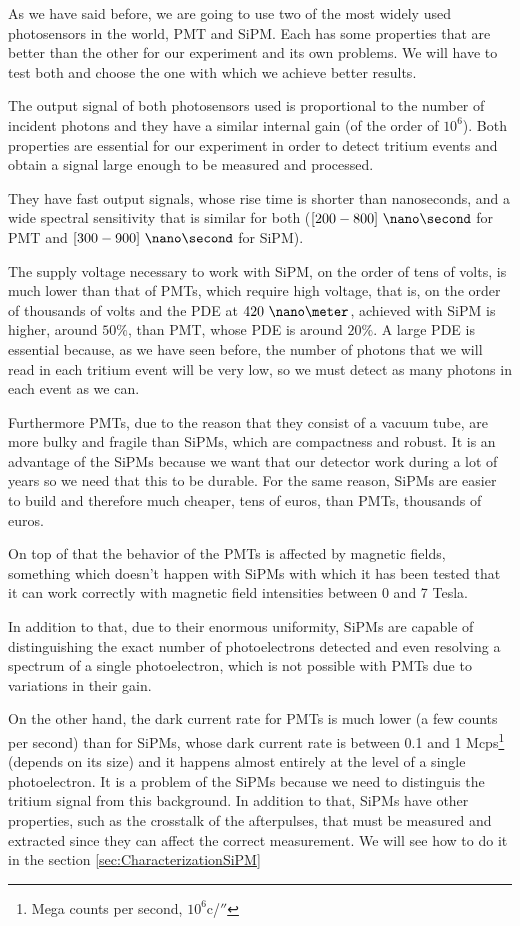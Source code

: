 As we have said before, we are going to use two of the most widely used photosensors in the world, PMT and SiPM. Each has some properties that are better than the other for our experiment and its own problems. We will have to test both and choose the one with which we achieve better results.

The output signal of both photosensors used is proportional to the number of incident photons and they have a similar internal gain (of the order of $10^6$). Both properties are essential for our experiment in order to detect tritium events and obtain a signal large enough to be measured and processed. 

They have fast output signals, whose rise time is shorter than nanoseconds, and a wide spectral sensitivity that is similar for both ($[200-800]~\nano\second$ for PMT and $[300-900]~\nano\second$ for SiPM).

The supply voltage necessary to work with SiPM, on the order of tens of volts, is much lower than that of PMTs, which require high voltage, that is, on the order of thousands of volts and the PDE at $420~\nano\meter$,  achieved with SiPM is higher, around $50\%$, than PMT, whose PDE is around $20\%$. A large PDE is essential because, as we have seen before, the number of photons that we will read in each tritium event will be very low, so we must detect as many photons in each event as we can.

Furthermore PMTs, due to the reason that they consist of a vacuum tube, are more bulky and fragile than SiPMs, which are compactness and robust. It is an advantage of the SiPMs because we want that our detector work during a lot of years so we need that this to be durable. For the same reason, SiPMs are easier to build and therefore much cheaper, tens of euros, than PMTs, thousands of euros.

On top of that the behavior of the PMTs is affected by magnetic fields, something which doesn't happen with SiPMs with which it has been tested that it can work correctly with magnetic field intensities between 0 and 7 Tesla. 

In addition to that, due to their enormous uniformity, SiPMs are capable of distinguishing the exact number of photoelectrons detected and even resolving a spectrum of a single photoelectron, which is not possible with PMTs due to variations in their gain.

On the other hand, the dark current rate for PMTs is much lower (a few counts per second) than for SiPMs, whose dark current rate is between 0.1 and 1 Mcps\footnote{Mega counts per second, $10^6$c/$\second$} (depends on its size) and it happens almost entirely at the level of a single photoelectron. It is a problem of the SiPMs because we need to distinguis the tritium signal from this background. In addition to that, SiPMs have other properties, such as the crosstalk of the afterpulses, that must be measured and extracted since they can affect the correct measurement. We will see how to do it in the section \ref{sec:CharacterizationSiPM}

